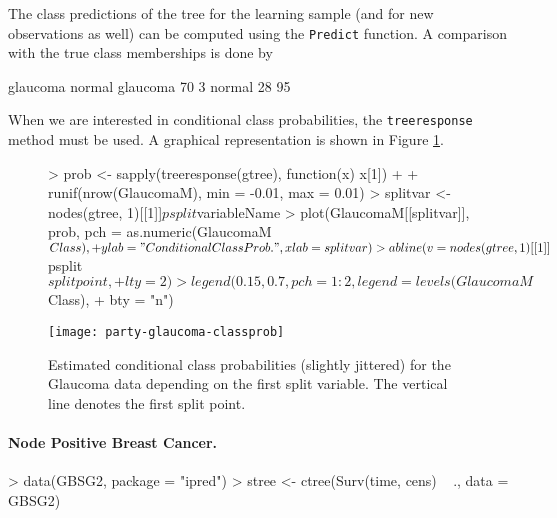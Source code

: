 \documentclass[letter]{article}
\begin{document}
The class predictions of the tree for the learning sample (and for new
observations as well) can be computed using the \texttt{Predict} function. A
comparison with the true class memberships is done by
\begin{Schunk}
\begin{Soutput}
           glaucoma normal
  glaucoma       70      3
  normal         28     95
\end{Soutput}
\end{Schunk}
When we are interested in conditional class probabilities, the
\texttt{treeresponse} method must be used. A graphical representation is
shown in Figure \ref{glaucoma-probplot}.

\begin{figure}[ht!]
\begin{center}
\begin{Schunk}
\begin{Sinput}
> prob <- sapply(treeresponse(gtree), function(x) x[1]) + 
+     runif(nrow(GlaucomaM), min = -0.01, max = 0.01)
> splitvar <- nodes(gtree, 1)[[1]]$psplit$variableName
> plot(GlaucomaM[[splitvar]], prob, pch = as.numeric(GlaucomaM$Class), 
+     ylab = "Conditional Class Prob.", xlab = splitvar)
> abline(v = nodes(gtree, 1)[[1]]$psplit$splitpoint, 
+     lty = 2)
> legend(0.15, 0.7, pch = 1:2, legend = levels(GlaucomaM$Class), 
+     bty = "n")
\end{Sinput}
\end{Schunk}
\texttt{[image: party-glaucoma-classprob]}
\caption{Estimated conditional class probabilities (slightly jittered) 
         for the Glaucoma data depending on the first split variable. 
         The vertical line denotes the first split point. \label{glaucoma-probplot}}
\end{center}
\end{figure}

\paragraph{Node Positive Breast Cancer.}

\begin{Schunk}
\begin{Sinput}
> data(GBSG2, package = "ipred")
> stree <- ctree(Surv(time, cens) ~ ., data = GBSG2)
\end{Sinput}
\end{Schunk}
\end{document}
